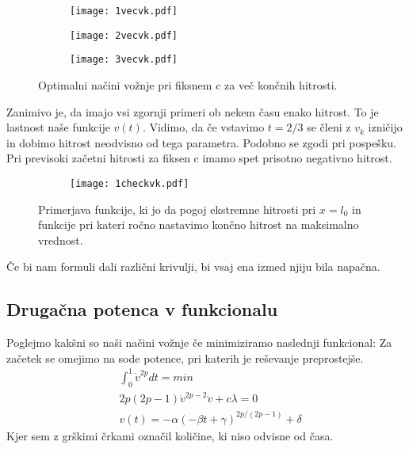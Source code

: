 \documentclass{article}
\begin{document}
\begin{figure}[H]
\centering
\begin{subfigure}{.5\textwidth}
\texttt{[image: 1vecvk.pdf]}
\end{subfigure}
\end{figure}
\begin{figure}[H]
\begin{subfigure}{.5\textwidth}
\texttt{[image: 2vecvk.pdf]}
\end{subfigure}
\begin{subfigure}{.5\textwidth}
\texttt{[image: 3vecvk.pdf]}
\end{subfigure}
\caption*{Optimalni načini vožnje pri fiksnem c za več končnih hitrosti.}
\end{figure}
Zanimivo je, da imajo vsi zgornji primeri ob nekem času enako hitrost. To je lastnost naše funkcije $v(t)$. Vidimo, da če vstavimo $t=2/3$ se členi z $v_k$ izničijo in dobimo hitrost neodvisno od tega parametra. Podobno se zgodi pri pospešku.
Pri previsoki začetni hitrosti za fiksen c imamo spet prisotno negativno hitrost.

\begin{figure}[H]
\centering
\begin{subfigure}{.5\textwidth}
\texttt{[image: 1checkvk.pdf]}
\end{subfigure}
\caption*{Primerjava funkcije, ki jo da pogoj ekstremne hitrosti pri $x=l_0$ in funkcije pri kateri ročno nastavimo končno hitrost na maksimalno vrednost.}
\end{figure}

Če bi nam formuli dali različni krivulji, bi vsaj ena izmed njiju bila napačna.

\subsection{Drugačna potenca v funkcionalu}
Poglejmo kakšni so naši načini vožnje če minimiziramo naslednji funkcional:
Za začetek se omejimo na sode potence, pri katerih je reševanje preprostejše.
\begin{align*}
&\int_0^1 \dot{v}^{2p} dt= min \\
&2p(2p-1)\dot{v}^{2p-2}\ddot{v} + c \lambda = 0 \\
&v(t) = -\alpha (-\beta t+ \gamma )^{2p/(2p-1)} + \delta
\end{align*}
Kjer sem z grškimi črkami označil količine, ki niso odvisne od časa.
\end{document}
